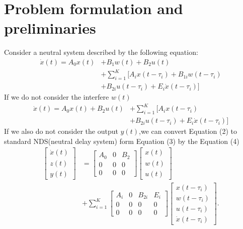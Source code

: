 \documentclass[twocolumn]{autart}    %
\begin{document}
\section{Problem formulation and preliminaries}
Consider a neutral system described by the following equation:
\begin{equation} \label{e1}
    \begin{aligned}
        \dot{x}(t) = A_{0}x(t) & +B_{1}w(t)+B_{2}u(t) \\ 
        &+\sum_{i=1}^{K}[A_{i}x(t-\tau_{i})+B_{1i}w(t-\tau_{i}) \\ 
        &+B_{2i}u(t-\tau_{i})+E_{i}\dot{x}(t-\tau_{i})]
    \end{aligned}
\end{equation}
If we do not consider the interfere $w(t)$
\begin{equation} \label{e1}
    \begin{aligned}
    \dot{x}(t) = A_{0}x(t)+B_{2}u(t) & +\sum_{i=1}^{K}[A_{i}x(t-\tau_{i})\\
    & +B_{2i}u(t-\tau_{i})+E_{i}\dot{x}(t-\tau_{i})]
    \end{aligned}
\end{equation}
If we also do not consider the output $y(t)$,we can convert Equation (2) to standard NDS(neutral delay system) form Equation (3) by the Equation (4)
\begin{equation}
    \begin{aligned}
        \begin{bmatrix}
            \dot{x}(t) \\
            z(t) \\
            y(t) 
        \end{bmatrix} & = \begin{bmatrix}
            A_{0} & 0 & B_{2}\\
            0 & 0 & 0\\
            0 & 0 & 0
        \end{bmatrix}\begin{bmatrix}
            x(t) \\
            w(t) \\
            u(t) 
        \end{bmatrix} \\ 
        &+ \sum_{i=1}^{K}\begin{bmatrix}
            A_{i} & 0 & B_{2i} & E_{i}\\
            0 & 0 & 0 & 0\\
            0 & 0 & 0 & 0
        \end{bmatrix} \begin{bmatrix}
            x(t-\tau_{i}) \\
            w(t-\tau_{i}) \\
            u(t-\tau_{i}) \\
            \dot{x}(t-\tau_{i})
        \end{bmatrix}.\label{eq}
    \end{aligned}
\end{equation}
\end{document}
